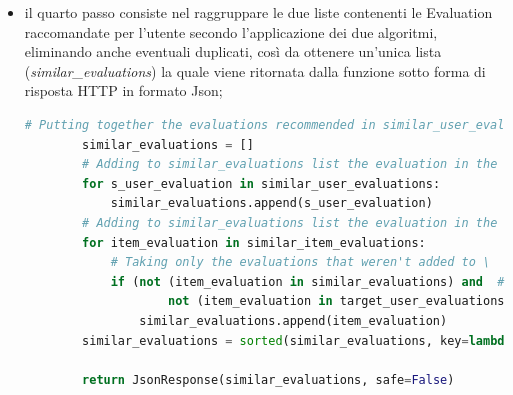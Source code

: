 \begin{itemize}
\begin{lstlisting}[language=Python, label=lst:CF_Hybrid_Evaluation_4]
                # Taking only the evaluations that have: different other_id (excluding the target evaluation
                # in the recommendation) and same parent_id and the evaluations that weren't added to 'similar_item_evaluations'
                # list or to 'similar_user_evaluations' or to 'target_user_evaluations'
                if ((t_user_evaluation['other_id'] != item_evaluation['other_id']) and # Evaluations must have different 'id'
                        (t_user_evaluation['parent_id'] == item_evaluation['parent_id']) and # Evaluations must have the same 'parent_id'
                        # Evaluation in all_other_evals list mustn't be already added to \
                        not (item_evaluation in similar_item_evaluations) and # the 'similar_item_evaluations' list,
                        not (item_evaluation in similar_user_evaluations) and # the 'similar_user_evaluations' list or
                        not (item_evaluation in target_user_evaluations)): # the 'target_user_evaluations' list
                    similar_item_evaluations.append(item_evaluation)
    \end{lstlisting} 
    \item il quarto passo consiste nel raggruppare le due liste contenenti le Evaluation raccomandate per l'utente secondo l'applicazione dei 
    due algoritmi, eliminando anche eventuali duplicati, così da ottenere un'unica lista (\textit{similar\_evaluations}) la quale viene ritornata dalla 
    funzione sotto forma di risposta HTTP in formato Json;
    \begin{lstlisting}[language=Python, label=lst:CF_Hybrid_Evaluation_5]
        # Putting together the evaluations recommended in similar_user_evaluations list and similar_item_evaluations list
        similar_evaluations = []
        # Adding to similar_evaluations list the evaluation in the similar_user_evaluations list
        for s_user_evaluation in similar_user_evaluations:
            similar_evaluations.append(s_user_evaluation)
        # Adding to similar_evaluations list the evaluation in the similar_item_evaluations list
        for item_evaluation in similar_item_evaluations:
            # Taking only the evaluations that weren't added to \
            if (not (item_evaluation in similar_evaluations) and  # the 'similar_evaluations' list or
                    not (item_evaluation in target_user_evaluations)):  # the 'target_user_evaluations' list
                similar_evaluations.append(item_evaluation)
        similar_evaluations = sorted(similar_evaluations, key=lambda i: i['other_id'])
        
        return JsonResponse(similar_evaluations, safe=False)
    \end{lstlisting} 
\end{itemize}

